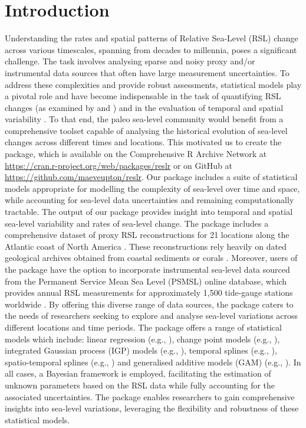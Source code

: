 \section{Introduction}\label{introduction}
Understanding the rates and spatial patterns of Relative Sea-Level (RSL) change across various timescales, spanning from decades to millennia, poses a significant challenge. The task involves analysing sparse and noisy proxy and/or instrumental data sources that often have large measurement uncertainties. To address these complexities and provide robust assessments, statistical models play a pivotal role and have become indispensable in the task of quantifying RSL changes (as examined by \citet{Cahill2015aStats} and \citet{Khan2015}) and in the evaluation of temporal and spatial variability \citep[e.g.,][]{Kopp2013, Kopp2016, Kemp2018, Walker2021}. To that end, the paleo sea-level community would benefit from a comprehensive toolset capable of analysing the historical evolution of sea-level changes across different times and locations. This motivated us to create the  package, which is available on the Comprehensive R Archive Network at \url{https://cran.r-project.org/web/packages/reslr} or on GitHub at \url{https://github.com/maeveupton/reslr}. Our package includes a suite of statistical models appropriate for modelling the complexity of sea-level over time and space, while accounting for sea-level data uncertainties and remaining computationally tractable. The output of our package provides insight into temporal and spatial sea-level variability and rates of sea-level change.
The  package includes a comprehensive dataset of proxy RSL reconstructions for 21 locations along the Atlantic coast of North America \citep{Kemp2013SealevelUSA}. These reconstructions rely heavily on dated geological archives obtained from coastal sediments \citep[e.g.,][]{Gehrels1994} or corals \citep[e.g.,][]{Meltzner2017}. Moreover, users of the package have the option to incorporate instrumental sea-level data sourced from the Permanent Service Mean Sea Level (PSMSL) online database, which provides annual RSL measurements for approximately 1,500 tide-gauge stations worldwide \citep{Holgate_PSMSL2013}. By offering this diverse range of data sources, the  package caters to the needs of researchers seeking to explore and analyse sea-level variations across different locations and time periods.
The  package offers a range of statistical models which include: linear regression (e.g., \citet{Ashe2019}), change point models (e.g., \citet{Cahill2015_cp}), integrated Gaussian process (IGP) models (e.g., \citet{Cahill2015aStats}), temporal splines (e.g., \citet{deBoor1978}), spatio-temporal splines (e.g., \citet{simpson2018modelling}) and generalised additive models (GAM) (e.g., \citet{Upton2023noisy}). In all cases, a Bayesian framework is employed, facilitating the estimation of unknown parameters based on the RSL data while fully accounting for the associated uncertainties. The  package enables researchers to gain comprehensive insights into sea-level variations, leveraging the flexibility and robustness of these statistical models.
